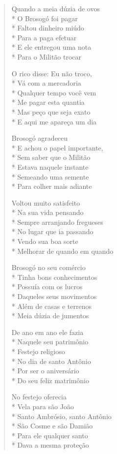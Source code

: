\begin{verse}
Quando a meia dúzia de ovos\\*
O Brosogó foi pagar\\*
Faltou dinheiro miúdo\\*
Para a paga efetuar\\*
E ele entregou uma nota\\*
Para o Militão trocar

O rico disse: Eu não troco,\\*
Vá com a mercadoria\\*
Qualquer tempo você vem\\*
Me pagar esta quantia\\*
Mas peço que seja exato\\*
E aqui me apareça um dia

Brosogó agradeceu\\*
E achou o papel importante,\\*
Sem saber que o Militão\\*
Estava naquele instante\\*
Semeando uma semente\\*
Para colher mais adiante

Voltou muito satisfeito\\*
Na sua vida pensando\\*
Sempre arranjando fregueses\\*
No lugar que ia passando\\*
Vendo sua boa sorte\\*
Melhorar de quando em quando

Brosogó no seu comércio\\*
Tinha bons conhecimentos\\*
Possuía com os lucros\\*
Daqueles seus movimentos\\*
Além de casas e terrenos\\*
Meia dúzia de jumentos

De ano em ano ele fazia\\*
Naquele seu patrimônio\\*
Festejo religioso\\*
No dia de santo Antônio\\*
Por ser o aniversário\\*
Do seu feliz matrimônio

No festejo oferecia\\*
Vela para são João\\*
Santo Ambrósio, santo Antônio\\*
São Cosme e são Damião\\*
Para ele qualquer santo\\*
Dava a mesma proteção


\end{verse}
